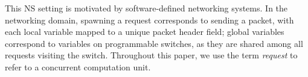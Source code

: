 %
%
This NS setting is motivated by software-defined networking systems. In the networking domain, spawning a request corresponds to sending a packet, with each local variable mapped to a unique packet header field; global variables correspond to variables on programmable switches, as they are shared among all requests visiting the switch. Throughout this paper, we use the term \emph{request} to refer to a concurrent computation unit. 
    
